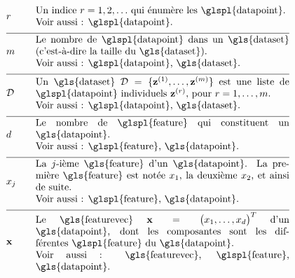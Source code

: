 \begin{align}
	& \sampleidx & \quad & \parbox{.75\textwidth}{Un indice $\sampleidx=1,2,\ldots$ qui énumère les \glspl{datapoint}. \\ Voir aussi : \glspl{datapoint}.} \nonumber \\[2mm] \hline \nonumber\\[-5mm]
	& \samplesize & \quad & \parbox{.75\textwidth}{Le nombre de \glspl{datapoint} dans un \gls{dataset} (c’est-à-dire la taille du \gls{dataset}). \\ Voir aussi : \glspl{datapoint}, \gls{dataset}.} \nonumber \\[2mm] \hline \nonumber\\[-5mm] 
	& \dataset & \quad & \parbox{.75\textwidth}{Un \gls{dataset} $\dataset = \{ \datapoint^{(1)},\ldots, \datapoint^{(\samplesize)} \}$ est une liste de \glspl{datapoint} individuels $\datapoint^{(\sampleidx)}$, pour $\sampleidx=1,\ldots,\samplesize$. \\ Voir aussi : \glspl{datapoint}, \gls{dataset}.} \nonumber \\[2mm] \hline \nonumber\\[-5mm]
	& \featurelen & \quad & \parbox{.75\textwidth}{Le nombre de \glspl{feature} qui constituent un \gls{datapoint}. \\ Voir aussi : \glspl{feature}, \gls{datapoint}.} \nonumber \\[2mm] \hline \nonumber\\[-5mm]
	& \feature_{\featureidx} & \quad & \parbox{.75\textwidth}{La $\featureidx$-ième \gls{feature} d’un \gls{datapoint}. La première \gls{feature} est notée $\feature_{1}$, la deuxième $\feature_{2}$, et ainsi de suite. \\ Voir aussi : \glspl{feature}, \gls{datapoint}.} \nonumber \\[2mm] \hline \nonumber\\[-5mm] 
	& \featurevec & \quad & \parbox{.75\textwidth}{Le \gls{featurevec} $\featurevec=\big(\feature_{1},\ldots,\feature_{\featuredim}\big)^{T}$ d’un \gls{datapoint}, dont les composantes sont les différentes \glspl{feature} du \gls{datapoint}. \\ Voir aussi : \gls{featurevec}, \glspl{feature}, \gls{datapoint}.} \nonumber
\end{align}


